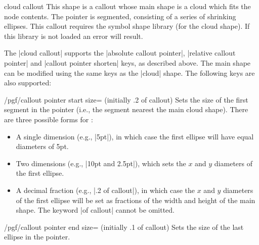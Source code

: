 \begin{shape}{cloud callout}
    This shape is a callout whose main shape is a cloud which fits the node
    contents. The pointer is segmented, consisting of a series of shrinking
    ellipses. This callout requires the symbol shape library (for the cloud
    shape). If this library is not loaded an error will result.
\begin{codeexample}[preamble={\usetikzlibrary{shapes.callouts}}]
\end{codeexample}

    The |cloud callout| supports the |absolute callout pointer|,
    |relative callout pointer| and |callout pointer shorten| keys, as described
    above. The main shape can be modified using the same keys as the |cloud|
    shape. The following keys are also supported:

    \begin{key}{/pgf/callout pointer start size= (initially .2 of callout)}
        Sets the size of the first segment in the pointer (i.e., the segment
        nearest the main cloud shape). There are three possible forms for
        :
        \begin{itemize}
            \item A single dimension (e.g., |5pt|), in which case the first
                ellipse will have equal diameters of 5pt.
            \item Two dimensions (e.g., |10pt and 2.5pt|), which sets the $x$
                and $y$ diameters of the first ellipse.
            \item A decimal fraction (e.g., |.2 of callout|), in which case the
                $x$ and $y$ diameters of the first ellipse will be set as
                fractions of the width and height of the main shape. The
                keyword |of callout| cannot be omitted.
        \end{itemize}
    \end{key}

    \begin{key}{/pgf/callout pointer end size= (initially .1 of callout)}
        Sets the size of the last ellipse in the pointer.
    \end{key}


\end{shape}
